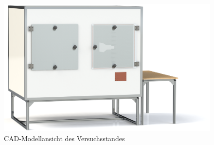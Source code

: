 \begin{figure}[ht]
    \centering
    \hspace*{2cm}\includegraphics[width = .7\textwidth, trim = 0cm 0cm 1cm 0cm, clip]{Abbildungen/Kapitel3/Absorberkammer_Frontansicht.png}
    \caption{CAD-Modellansicht des Versuchsstandes}
    \label{fig:3_Entwurf_CAD}
\end{figure}
















